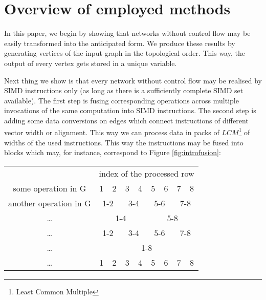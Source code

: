 \section{Overview of employed methods}

In this paper, we begin by showing that networks without control flow may be easily transformed into the anticipated form. We produce these results by generating vertices of the input graph in the topological order. This way, the output of every vertex gets stored in a unique variable. 

  
Next thing we show is that every network without control flow may be realised by SIMD instructions only (as long as there is a sufficiently complete SIMD set available). The first step is fusing corresponding operations across multiple invocations of the same computation into SIMD instructions. The second step is adding some data conversions on edges which connect instructions of different vector width or alignment. This way we can process data in packs of $LCM$\footnote{Least Common Multiple} of widths of the used instructions. This way the instructions may be fused into blocks which may, for instance, correspond to Figure \ref{fig:introfusion}:

\mybeginfig
\begin{center}
  \begin{tabular}{c|c|c|c|c|c|c|c|c|}
    \cline{2-9}
    & \multicolumn{8}{c|}{index of the processed row}\\
    \cline{2-9}
    some operation in G & 1 & 2 & 3 & 4 & 5 & 6 & 7 & 8 \\
    \cline{2-9}
    another operation in G & \multicolumn{2}{c|}{1-2} & \multicolumn{2}{c|}{3-4} & \multicolumn{2}{c|}{5-6} & \multicolumn{2}{c|}{7-8} \\
    \cline{2-9}
    \dots & \multicolumn{4}{c|}{1-4} & \multicolumn{4}{c|}{5-8}\\
    \cline{2-9}
    \dots & \multicolumn{2}{c|}{1-2} & \multicolumn{2}{c|}{3-4} & \multicolumn{2}{c|}{5-6} & \multicolumn{2}{c|}{7-8}\\
    \cline{2-9}
    \dots & \multicolumn{8}{c|}{1-8} \\
    \cline{2-9}
    \dots & 1 & 2 & 3 & 4 & 5 & 6 & 7 & 8\\
    \cline{2-9}
  \end{tabular}
\end{center}


